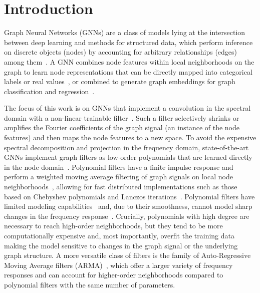 \documentclass{article}
\begin{document}
\section{Introduction}
Graph Neural Networks (GNNs) are a class of models lying at the intersection between deep learning and methods for structured data, which perform inference on discrete objects (nodes) by accounting for arbitrary relationships (edges) among them~\cite{bronstein2017geometric, battaglia2018relational}.
A GNN combines node features within local neighborhoods on the graph to learn node representations that can be directly mapped into categorical labels or real values~\cite{scarselli2009graph,klicpera2019predict}, or combined to generate graph embeddings for graph classification and regression~\cite{perozzi2014deepwalk, duvenaud2015convolutional, yang2016revisiting, hamilton2017inductive, bacciu2018contextual}.

The focus of this work is on GNNs that implement a convolution in the spectral domain with a non-linear trainable filter~\cite{bruna2013spectral, henaff2015deep}.
Such a filter selectively shrinks or amplifies the Fourier coefficients of the graph signal (an instance of the node features) and then maps the node features to a new space.
To avoid the expensive spectral decomposition and projection in the frequency domain, state-of-the-art GNNs implement graph filters as low-order polynomials that are learned directly in the node domain~\cite{defferrard2016convolutional,kipf2016semi,kipf2016variational}.
Polynomial filters have a finite impulse response and perform a weighted moving average filtering of graph signals on local node neighborhoods~\cite{tremblay2018design}, allowing for fast distributed implementations such as those based on Chebyshev polynomials and Lanczos iterations~\cite{susnjara2015accelerated, defferrard2016convolutional, liao2018lanczos}.
Polynomial filters have limited modeling capabilities~\cite{isufi2016autoregressive} and, due to their smoothness, cannot model sharp changes in the frequency response~\cite{tremblay2018design}.
Crucially, polynomials with high degree are necessary to reach high-order neighborhoods, but they tend to be more computationally expensive and, most importantly, overfit the training data making the model sensitive to changes in the graph signal or the underlying graph structure. 
A more versatile class of filters is the family of Auto-Regressive Moving Average filters (ARMA)~\cite{narang2013signal}, which offer a larger variety of frequency responses and can account for higher-order neighborhoods compared to polynomial filters with the same number of parameters.
\end{document}
